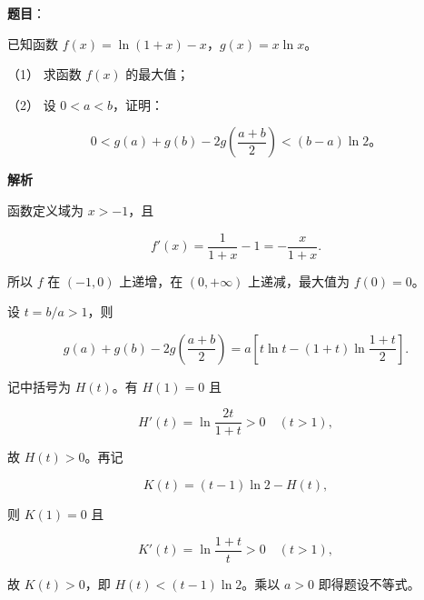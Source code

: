 \begin{answer}

\textbf{题目}：

已知函数 $f(x)=\ln(1+x)-x$，$g(x)=x\ln x$。

（1） 求函数 $f(x)$ 的最大值；

（2） 设 $0<a<b$，证明：

\nopagebreak[4]
\[
0<g(a)+g(b)-2g\left(\frac{a+b}{2}\right)<(b-a)\ln2\text{。}
\]

\textbf{解析}


函数定义域为 $x>-1$，且

\nopagebreak[4]
\[
f'(x)=\frac1{1+x}-1=-\frac{x}{1+x}.
\]

所以 $f$ 在 $(-1,0)$ 上递增，在 $(0,+\infty)$ 上递减，最大值为 $f(0)=0$。


设 $t=b/a>1$，则

\nopagebreak[4]
\[
g(a)+g(b)-2g\left(\frac{a+b}{2}\right)
=a\left[t\ln t-(1+t)\ln\frac{1+t}{2}\right].
\]

记中括号为 $H(t)$。有 $H(1)=0$ 且

\nopagebreak[4]
\[
H'(t)=\ln\frac{2t}{1+t}>0\quad(t>1),
\]

故 $H(t)>0$。再记

\nopagebreak[4]
\[
K(t)=(t-1)\ln2-H(t),
\]

则 $K(1)=0$ 且

\nopagebreak[4]
\[
K'(t)=\ln\frac{1+t}{t}>0\quad(t>1),
\]

故 $K(t)>0$，即 $H(t)<(t-1)\ln2$。乘以 $a>0$ 即得题设不等式。



\end{answer}